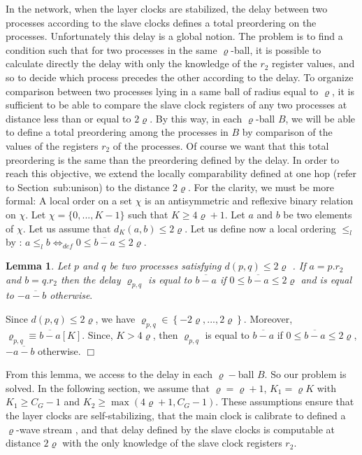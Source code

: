 \documentclass[11pt]{article}
\newenvironment{proof}{{\bf Proof. } }{{\hfill $\Box$}\vspace{.5pc}}
\newtheorem{lemma}[theorem]{Lemma}
\begin{document}
In the network, when the layer clocks are  stabilized, the delay between two processes according to the slave clocks   defines a total preordering  on the processes. 
Unfortunately this delay is a global notion. The problem is to
find a condition such that for two processes in the same $\varrho$-ball, it is
possible  to calculate directly the delay with only the knowledge of the $r_{2}$ register values, and so to decide which process precedes the other
according to the delay. 
To organize comparison between two processes lying  in a same ball of radius
equal to $\varrho $, it is sufficient to be able to compare the slave clock
registers  of any two  processes at distance less than or equal to $2\varrho $. By
this way,  in each $\varrho$-ball $B$, we will be able to define a total
preordering among the processes in $B$ by comparison of the values of the
registers $r_{2}$ of the processes. Of course we want that this total
preordering is the same than the preordering defined by the delay.
In order to reach this objective, we extend the locally comparability defined at one hop (refer to Section~{sub:unison}) 
to the distance $2\varrho$.  For the clarity, we must be
more formal:
A local order on a set $\chi $ is an antisymmetric and reflexive binary
relation on $\chi$.
Let $\chi=\{0,...,K-1\}$ such that $K\geq 4\varrho +1$. 
Let $a$ and $b$ be two elements of $\chi $. Let us assume that $d_{K}\left(
a,b\right) \leq 2\varrho $. Let us define now a local ordering  $\leq
_{l}$ by : 
$a\leq _{l}b\Leftrightarrow _{def}0\leq \overline{b-a}\leq 2\varrho $.


\begin{lemma}
Let $p$ and $q$ be two processes satisfying $d\left( p,q\right) \leq
2\varrho $ . If $a=p.r_{2}$ and $b=q.r_{2}$ then the delay $\varrho _{p,q}$ is
equal to $\overline{b-a}$ if $0\leq \overline{b-a}\leq 2\varrho $ and is
equal to $-\overline{a-b}$ otherwise$.$
\end{lemma}

\begin{proof}
Since $d\left( p,q\right) \leq 2\varrho $, we have $\varrho _{p,q}\in
\left\{ -2\varrho ,...,2\varrho \right\} $.  Moreover, $\varrho
_{p,q}\equiv \overline{b-a}\left[ K\right] $.  Since, $K>4\varrho $, 
then $\varrho _{p,q}$ is equal to $\overline{b-a}$ if $0\leq \overline{b-a}\leq
2\varrho $, $-\overline{a-b}$ otherwise.
\end{proof}

From this lemma, we access to the delay in each $\varrho -$ball $B.$ So our
problem is solved. 
In the following section, we assume that $\varrho =\varrho +1$, $K_1=\varrho K$ with $K_{1}\geq C_{G}-1$ and $K_{2}\geq \max \left( 4\varrho +1,C_{G}-1\right) $. These assumptions ensure 
that the layer clocks are self-stabilizing, that the main clock is calibrate to defined a $\varrho $-wave stream , and that delay defined by the
slave clocks is computable at distance $2\varrho $ with the only knowledge of
the  slave clock registers $r_{2}$.
\end{document}
